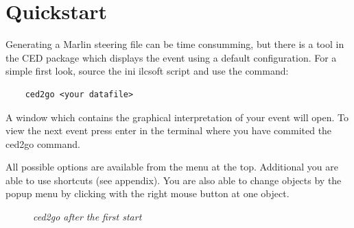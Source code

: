 \documentclass[a4paper,10pt]{article}
\begin{document}
\section{Quickstart}
Generating a Marlin steering file can be time consumming, but there is a tool in the CED package which displays the event using a default configuration. 
For a simple first look, source the ini ilcsoft script and use the command: 
\begin{verbatim}
    ced2go <your datafile>
\end{verbatim}
A window which contains the graphical interpretation of your event will open. 
To view the next event press enter in the terminal where you have commited the ced2go command.

All possible options are available from the menu at the top. 
Additional you are able to use shortcuts (see appendix). 
You are also able to change objects by the popup menu by clicking with the right mouse button at one object.

\begin{figure}
    \begin{center}
         \caption{\label{CEDViewer} \textsl{ced2go after the first start}}
    \end{center}
\end{figure}


\end{document}
